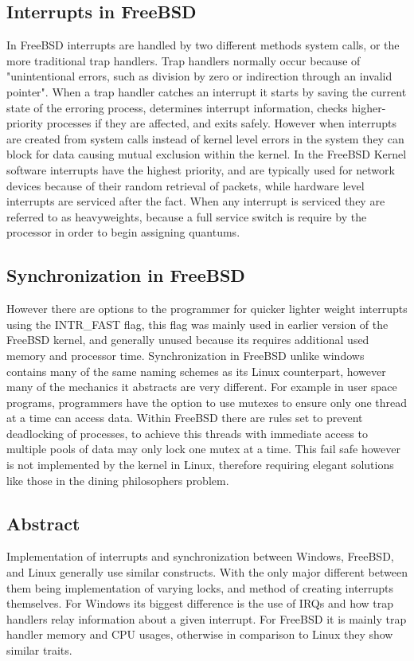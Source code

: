 \subsection{Interrupts in FreeBSD}
In FreeBSD interrupts are handled by two different methods system calls, or the more traditional trap handlers. Trap handlers normally occur because of "unintentional errors, such as division by zero or indirection through an invalid pointer"\cite{freeBsdBook}. When a trap handler catches an interrupt it starts by saving the current state of the erroring process, determines interrupt information, checks higher-priority processes if they are affected, and exits safely. However when interrupts are created from system calls instead of kernel level errors in the system they can block for data causing mutual exclusion within the kernel. In the FreeBSD Kernel software interrupts have the highest priority, and are typically used for network devices because of their random retrieval of packets\cite{freeBsdBook}, while hardware level interrupts are serviced after the fact. When any interrupt is serviced they are referred to as heavyweights, because a full service switch is require by the processor in order to begin assigning quantums\cite{83Genera16:online}. 
\subsection{Synchronization in FreeBSD}
However there are options to the programmer for quicker lighter weight interrupts using the INTR\_FAST flag, this flag was mainly used in earlier version of the FreeBSD kernel, and generally unused because its requires additional used memory and processor time\cite{83Genera16:online}. Synchronization in FreeBSD unlike windows contains many of the same naming schemes as its Linux counterpart, however many of the mechanics it abstracts are very different. For example in user space programs, programmers have the option to use mutexes to ensure only one thread at a time can access data. Within FreeBSD there are rules set to prevent deadlocking of processes, to achieve this threads with immediate access to multiple pools of data may only lock one mutex at a time\cite{43Contex5:online}. This fail safe however is not implemented by the kernel in Linux, therefore requiring elegant solutions like those in the dining philosophers problem.
\subsection{Abstract}
Implementation of interrupts and synchronization between Windows, FreeBSD, and Linux generally use similar constructs. With the only major different between them being implementation of varying locks, and method of creating interrupts themselves. For Windows its biggest difference is the use of IRQs and how trap handlers relay information about a given interrupt. For FreeBSD it is mainly trap handler memory and CPU usages, otherwise in comparison to Linux they show similar traits.\\
